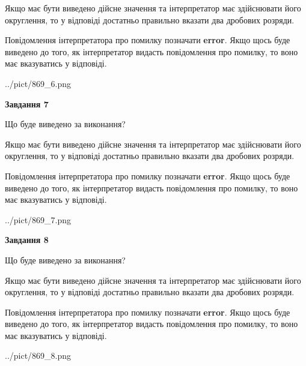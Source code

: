 \documentclass[12pt, ukrainian]{article}
\begin{document}
{\begin {Large}
Якщо має бути виведено дійсне значення та інтерпретатор має здійснювати його округлення, 
то у відповіді достатньо правильно вказати два дробових розряди.

Повідомлення інтерпретатора про помилку позначати \textbf{error}.
Якщо щось буде виведено до того, як інтерпретатор видасть повідомлення про помилку, 
то воно має вказуватись у відповіді. \par

\begin{center}
	{../pict/869_6.png}
\end{center}
\newpage

{\begin {center}\textbf{Завдання 7}\end {center}}\par
Що буде виведено за виконання? \par

Якщо має бути виведено дійсне значення та інтерпретатор має здійснювати його округлення, 
то у відповіді достатньо правильно вказати два дробових розряди.

Повідомлення інтерпретатора про помилку позначати \textbf{error}.
Якщо щось буде виведено до того, як інтерпретатор видасть повідомлення про помилку, 
то воно має вказуватись у відповіді. \par

\begin{center}
	{../pict/869_7.png}
\end{center}
\newpage

{\begin {center}\textbf{Завдання 8}\end {center}}\par
Що буде виведено за виконання? \par

Якщо має бути виведено дійсне значення та інтерпретатор має здійснювати його округлення, 
то у відповіді достатньо правильно вказати два дробових розряди.

Повідомлення інтерпретатора про помилку позначати \textbf{error}.
Якщо щось буде виведено до того, як інтерпретатор видасть повідомлення про помилку, 
то воно має вказуватись у відповіді. \par

\begin{center}
	{../pict/869_8.png}
\end{center}
\newpage


\end{Large}}
\end{document}
